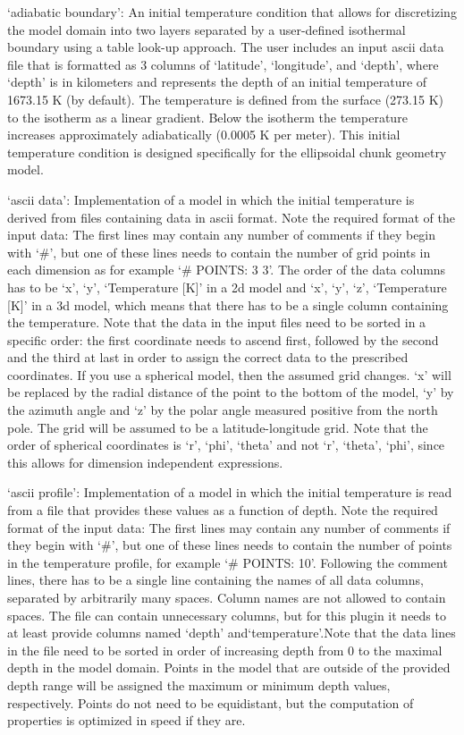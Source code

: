 \begin{itemize}
`adiabatic boundary': An initial temperature condition that allows for discretizing the model domain into two layers separated by a user-defined isothermal boundary using a table look-up approach. The user includes an input ascii data file that is formatted as 3 columns of `latitude', `longitude', and `depth', where `depth' is in kilometers and represents the depth of an initial temperature of 1673.15 K (by default). The temperature is defined from the surface (273.15 K) to the isotherm as a linear gradient. Below the isotherm the temperature increases approximately adiabatically (0.0005 K per meter). This initial temperature condition is designed specifically for the ellipsoidal chunk geometry model.

`ascii data': Implementation of a model in which the initial temperature is derived from files containing data in ascii format. Note the required format of the input data: The first lines may contain any number of comments if they begin with `#', but one of these lines needs to contain the number of grid points in each dimension as for example `# POINTS: 3 3'. The order of the data columns has to be `x', `y', `Temperature [K]' in a 2d model and  `x', `y', `z', `Temperature [K]' in a 3d model, which means that there has to be a single column containing the temperature. Note that the data in the input files need to be sorted in a specific order: the first coordinate needs to ascend first, followed by the second and the third at last in order to assign the correct data to the prescribed coordinates. If you use a spherical model, then the assumed grid changes. `x' will be replaced by the radial distance of the point to the bottom of the model, `y' by the azimuth angle and `z' by the polar angle measured positive from the north pole. The grid will be assumed to be a latitude-longitude grid. Note that the order of spherical coordinates is `r', `phi', `theta' and not `r', `theta', `phi', since this allows for dimension independent expressions.

`ascii profile': Implementation of a model in which the initial temperature is read from a file that provides these values as a function of depth. Note the required format of the input data: The first lines may contain any number of comments if they begin with `#', but one of these lines needs to contain the number of points in the temperature profile, for example `# POINTS: 10'. Following the comment lines, there has to be a single line containing the names of all data columns, separated by arbitrarily many spaces. Column names are not allowed to contain spaces. The file can contain unnecessary columns, but for this plugin it needs to at least provide columns named `depth' and`temperature'.Note that the data lines in the file need to be sorted in order of increasing depth from 0 to the maximal depth in the model domain. Points in the model that are outside of the provided depth range will be assigned the maximum or minimum depth values, respectively. Points do not need to be equidistant, but the computation of properties is optimized in speed if they are.


\end{itemize}
